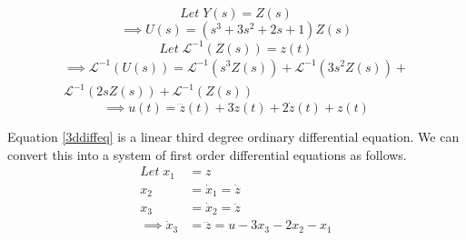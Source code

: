 \documentclass[journal,12pt,twocolumn]{IEEEtran}
\begin{document}
\begin{equation}
    Let \; Y(s) = Z(s)
    \label{z}
\end{equation}
\begin{equation}
    \implies U(s) = (s^3+3s^2+2s+1)Z(s)
\end{equation}
\begin{equation}
    Let \;\mathcal{L}^{-1}(Z(s)) = z(t)
\end{equation}
\begin{multline}
    \implies \mathcal{L}^{-1}(U(s)) = \mathcal{L}^{-1}(s^3Z(s))+\mathcal{L}^{-1}(3s^2Z(s))+\\\mathcal{L}^{-1}(2sZ(s))+\mathcal{L}^{-1}(Z(s))
\end{multline}
\begin{equation}
     \implies u(t) = \dddot{z}(t)+3\ddot{z}(t)+2\dot{z}(t)+z(t)
     \label{3ddiffeq}
\end{equation}

Equation \ref{3ddiffeq} is a linear third degree ordinary differential equation. We can convert this into a system of first order differential equations as follows.
\begin{align}
    Let\; x_1 &= z\\
    x_2 &= \dot{x}_1 = \dot{z}\\
    x_3 &= \dot{x}_2 = \ddot{z}\\
    \implies \dot{x}_3 &= \dddot{z} = u - 3x_3 - 2x_2 - x_1
\end{align}
\end{document}
